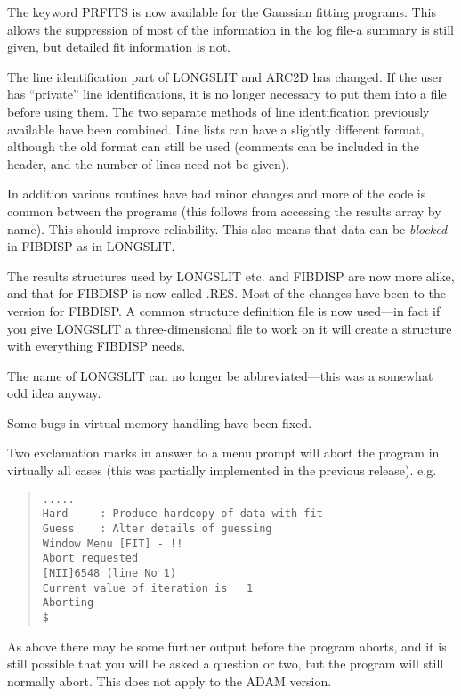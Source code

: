 \begin{list}{()}{}
\item
The keyword PRFITS is now available for the Gaussian fitting programs.
This allows the suppression of most of the information in the log file-a
summary is still given, but detailed fit information is not.

\item
The line identification part of LONGSLIT and ARC2D has changed.
If the user has ``private'' line identifications, it is no longer
necessary to put them into a file before using them.
The two separate methods of line identification previously available
have been combined.
Line lists can have a slightly different format, although the old format
can still be used (comments can be included in the header, and the
number of lines need not be given).

\item
In addition various routines have had minor changes and more of the code
is common between the programs (this follows from accessing the results
array by name).
This should improve reliability.
This also means that data can be {\em blocked} in FIBDISP as in
LONGSLIT.

\item
The results structures used by LONGSLIT etc. and FIBDISP are now more
alike, and that for FIBDISP is now called .RES.
Most of the changes have been to the version for FIBDISP.
A common structure definition file is now used---in fact if you give
LONGSLIT a three-dimensional file to work on it will create a structure
with everything FIBDISP needs.

\item
The name of LONGSLIT can no longer be abbreviated---this was a somewhat
odd idea anyway.

\item
Some bugs in virtual memory handling have been fixed.

\item
Two exclamation marks in answer to a menu prompt will abort the program
in virtually all cases (this was partially implemented in the previous
release). e.g.
\begin{quote}\begin{verbatim}
.....
Hard     : Produce hardcopy of data with fit
Guess    : Alter details of guessing
Window Menu [FIT] - !!
Abort requested
[NII]6548 (line No 1)
Current value of iteration is   1
Aborting
$
\end{verbatim}\end{quote}
As above there may be some further output before the program aborts, and
it is still possible that you will be asked a question or two, but the
program will still normally abort.
This does not apply to the ADAM version.


\end{list}
